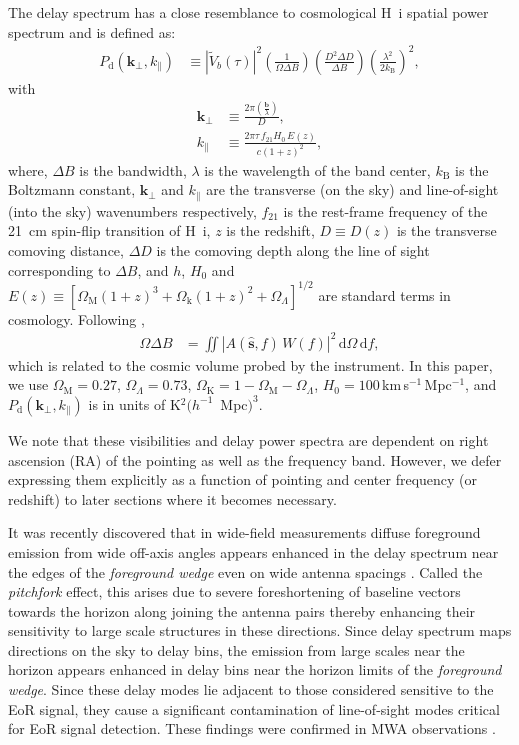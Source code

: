 \documentclass[preprint2,iop,numberedappendix,twocolappendix,appendixfloats]{emulateapj}
\newcommand{\dif}{\mathrm{d}}
\begin{document}
The delay spectrum has a close resemblance to cosmological H~{\sc i} spatial power spectrum and is defined as:
\begin{align}\label{eqn:delay-power-spectrum}
  P_\textrm{d}(\boldsymbol{k}_\perp,k_\parallel) &\equiv |\tilde{V}_b(\tau)|^2\left(\frac{1}{\Omega\Delta B}\right)\left(\frac{D^2\Delta D}{\Delta B}\right)\left(\frac{\lambda^2}{2k_\textrm{B}}\right)^2,
\end{align}
with
\begin{align}
  \boldsymbol{k}_\perp &\equiv \frac{2\pi(\frac{\boldsymbol{b}}{\lambda})}{D}, \label{eqn:kperp-baseline}\\
  k_\parallel &\equiv \frac{2\pi\tau\,f_{21}H_0\,E(z)}{c(1+z)^2}, \label{eqn:kprll-delay}
\end{align}
where, $\Delta B$ is the bandwidth, $\lambda$ is the wavelength of the band center, $k_\textrm{B}$ is the Boltzmann constant, $\boldsymbol{k}_\perp$ and $k_\parallel$ are the transverse (on the sky) and line-of-sight (into the sky) wavenumbers respectively, $f_{21}$ is the rest-frame frequency of the 21~cm spin-flip transition of H~{\sc i}, $z$ is the redshift, $D\equiv D(z)$ is the transverse comoving distance, $\Delta D$ is the comoving depth along the line of sight corresponding to $\Delta B$, and $h$, $H_0$ and $E(z)\equiv [\Omega_\textrm{M}(1+z)^3+\Omega_\textrm{k}(1+z)^2+\Omega_\Lambda]^{1/2}$ are standard terms in cosmology. Following \citet{par14},
\begin{align}
  \Omega\Delta B &= \iint \left|A(\hat{\boldsymbol{s}},f)\,W(f)\right|^2\,\dif\Omega\,\dif f,
\end{align}
which is related to the cosmic volume probed by the instrument. In this paper, we use $\Omega_\textrm{M}=0.27$, $\Omega_\Lambda=0.73$, $\Omega_\textrm{K}=1-\Omega_\textrm{M}-\Omega_\Lambda$, $H_0=100\,$km$\,$s$^{-1}\,$Mpc$^{-1}$, and $P_\textrm{d}(\boldsymbol{k}_\perp,k_\parallel)$ is in units of K$^2 (h^{-1}$~Mpc$)^3$.

We note that these visibilities and delay power spectra are dependent on right ascension (RA) of the pointing as well as the frequency band. However, we defer expressing them explicitly as a function of pointing and center frequency (or redshift) to later sections where it becomes necessary.

It was recently discovered that in wide-field measurements diffuse foreground emission from wide off-axis angles appears enhanced in the delay spectrum near the edges of the {\it foreground wedge} even on wide antenna spacings \citep{thy15a}. Called the {\it pitchfork} effect, this arises due to severe foreshortening of baseline vectors towards the horizon along joining the antenna pairs thereby enhancing their sensitivity to large scale structures in these directions. Since delay spectrum maps directions on the sky to delay bins, the emission from large scales near the horizon appears enhanced in delay bins near the horizon limits of the {\it foreground wedge}. Since these delay modes lie adjacent to those considered sensitive to the EoR signal, they cause a significant contamination of line-of-sight modes critical for EoR signal detection. These findings were confirmed in MWA observations \citep{thy15b}.
\end{document}
